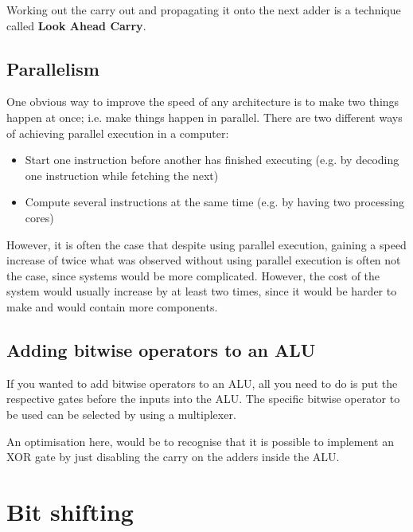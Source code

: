 Working out the carry out and propagating it onto the next adder is a technique
called {\bf Look Ahead Carry}.

\subsection{Parallelism}

One obvious way to improve the speed of any architecture is to make two things
happen at once; i.e. make things happen in parallel. There are two different
ways of achieving parallel execution in a computer:

\begin{itemize}

	\item Start one instruction before another has finished executing (e.g. by
	decoding one instruction while fetching the next)

	\item Compute several instructions at the same time (e.g. by having two
	processing cores)

\end{itemize}


However, it is often the case that despite using parallel execution, gaining a
speed increase of twice what was observed without using parallel execution is
often not the case, since systems would be more complicated. However, the cost
of the system would usually increase by at least two times, since it would be
harder to make and would contain more components.


\subsection{Adding bitwise operators to an ALU}

If you wanted to add bitwise operators to an ALU, all you need to do is put the
respective gates before the inputs into the ALU. The specific bitwise operator
to be used can be selected by using a multiplexer.

An optimisation here, would be to recognise that it is possible to implement an
XOR gate by just disabling the carry on the adders inside the ALU.

\section{Bit shifting}

